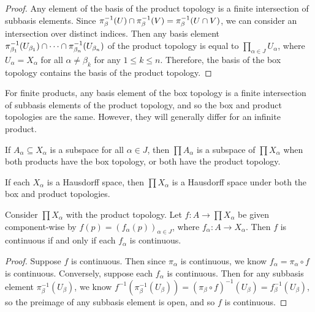 \begin{proof}
    Any element of the basis of the product topology is a finite intersection of subbasis elements. Since $\pi_{\beta}^{-1}(U) \cap \pi_{\beta}^{-1}(V) = \pi_{\beta}^{-1}(U \cap V)$, we can consider an intersection over distinct indices. Then any basis element $\pi_{\beta_1}^{-1}(U_{\beta_1}) \cap \cdots \cap \pi_{\beta_n}^{-1}(U_{\beta_n})$ of the product topology is equal to $\prod_{\alpha\in J}U_{\alpha}$, where $U_{\alpha} = X_{\alpha}$ for all $\alpha\neq\beta_k$ for any $1 \leq k \leq n$. Therefore, the basis of the box topology contains the basis of the product topology.
\end{proof}

\begin{rmk}
    For finite products, any basis element of the box topology is a finite intersection of subbasis elements of the product topology, and so the box and product topologies are the same. However, they will generally differ for an infinite product.
\end{rmk}

\begin{thm}
    If $A_{\alpha} \subseteq X_{\alpha}$ is a subspace for all $\alpha \in J$, then $\prod A_{\alpha}$ is a subspace of $\prod X_{\alpha}$ when both products have the box topology, or both have the product topology.
\end{thm}

\begin{thm}
    If each $X_{\alpha}$ is a Hausdorff space, then $\prod X_{\alpha}$ is a Hausdorff space under both the box and product topologies.
\end{thm}

\begin{thm}
    Consider $\prod X_{\alpha}$ with the product topology. Let $f: A \to \prod X_{\alpha}$ be given component-wise by $f(p) = (f_{\alpha}(p))_{\alpha\in J}$, where $f_{\alpha}: A \to X_{\alpha}$. Then $f$ is continuous if and only if each $f_{\alpha}$ is continuous.
\end{thm}

\begin{proof}
    Suppose $f$ is continuous. Then since $\pi_{\alpha}$ is continuous, we know $f_{\alpha} = \pi_{\alpha} \circ f$ is continuous. Conversely, suppose each $f_{\alpha}$ is continuous. Then for any subbasis element $\pi_{\beta}^{-1}(U_{\beta})$, we know $f^{-1}(\pi_{\beta}^{-1}(U_{\beta})) = (\pi_{\beta}\circ f)^{-1}(U_{\beta}) = f_{\beta}^{-1}(U_{\beta})$, so the preimage of any subbasis element is open, and so $f$ is continuous.
\end{proof}

